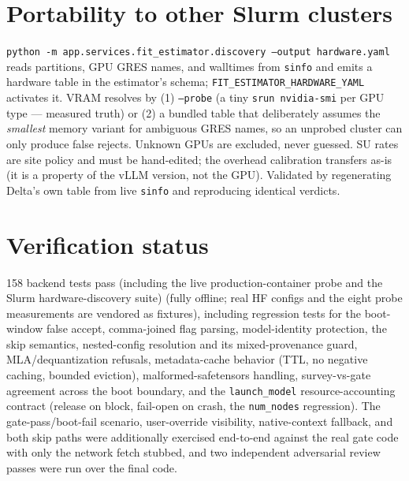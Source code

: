 \documentclass[11pt]{article}
\newcommand{\code}[1]{\texttt{#1}}
\begin{document}
\section{Portability to other Slurm clusters}

\code{python -m app.services.fit\_estimator.discovery --output hardware.yaml}
reads partitions, GPU GRES names, and walltimes from \code{sinfo} and emits a
hardware table in the estimator's schema; \code{FIT\_ESTIMATOR\_HARDWARE\_YAML}
activates it. VRAM resolves by (1) \code{--probe} (a tiny \code{srun
nvidia-smi} per GPU type --- measured truth) or (2) a bundled table that
deliberately assumes the \emph{smallest} memory variant for ambiguous GRES
names, so an unprobed cluster can only produce false rejects. Unknown GPUs are
excluded, never guessed. SU rates are site policy and must be hand-edited; the
overhead calibration transfers as-is (it is a property of the vLLM version, not
the GPU). Validated by regenerating Delta's own table from live \code{sinfo}
and reproducing identical verdicts.

\section{Verification status}

158 backend tests pass (including the live production-container probe and the Slurm hardware-discovery suite) (fully offline; real HF configs and the eight probe
measurements are vendored as fixtures), including regression tests for the
boot-window false accept, comma-joined flag parsing, model-identity
protection, the skip semantics, nested-config resolution and its
mixed-provenance guard, MLA/dequantization refusals, metadata-cache behavior
(TTL, no negative caching, bounded eviction), malformed-safetensors handling,
survey-vs-gate agreement across the boot boundary, and the
\code{launch\_model} resource-accounting contract (release on block, fail-open
on crash, the \code{num\_nodes} regression). The gate-pass/boot-fail scenario,
user-override visibility, native-context fallback, and both skip paths were
additionally exercised end-to-end against the real gate code with only the
network fetch stubbed, and two independent adversarial review passes were run
over the final code.
\end{document}
